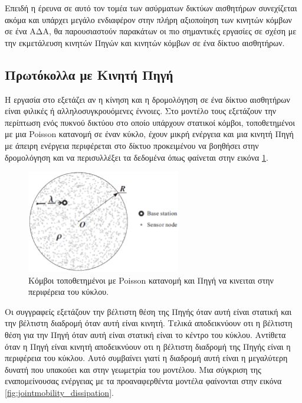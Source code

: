 Επειδή η έρευνα σε αυτό τον τομέα των ασύρματων δικτύων αισθητήρων συνεχίζεται ακόμα και υπάρχει μεγάλο ενδιαφέρον στην πλήρη αξιοποίηση των κινητών κόμβων σε ένα
ΑΔΑ, θα παρουσιαστούν παρακάτων οι πιο σημαντικές εργασίες σε σχέση με την εκμετάλευση κινητών Πηγών και κινητών κόμβων σε ένα δίκτυο αισθητήρων.

\subsection{Πρωτόκολλα με Κινητή Πηγή}
Η εργασία στο \cite{jointmobility} εξετάζει αν η κίνηση και η δρομολόγηση σε ένα δίκτυο αισθητήρων είναι φιλικές ή αλληλοσυγκρουόμενες έννοιες. Στο μοντέλο τους
εξετάζουν την περίπτωση ενός πυκνού δικτύου στο οποίο υπάρχουν στατικοί κόμβοι, τοποθετημένοι με μια Poisson κατανομή σε έναν κύκλο, έχουν μικρή ενέργεια και μια
κινητή Πηγή με άπειρη ενέργεια περιφέρεται στο δίκτυο προκειμένου να βοηθήσει στην δρομολόγηση και να περισυλλέξει τα δεδομένα όπως φαίνεται στην εικόνα
\ref{fig:jointmobility_model}.
\begin{figure}[h]
	\centering
	\includegraphics[width=0.6\textwidth]{images/jointmobility_model.eps}
	\caption{Κόμβοι τοποθετημένοι με Poisson κατανομή και Πηγή να κινειται στην περιφέρεια του κύκλου.}
	\label{fig:jointmobility_model}
\end{figure}
Οι συγγραφείς εξετάζουν την βέλτιστη θέση της Πηγής όταν αυτή είναι στατική και την βέλτιστη διαδρομή όταν αυτή είναι κινητή. Τελικά αποδεικνύουν οτι η βέλτιστη θέση
για την Πηγή όταν αυτή είναι στατική είναι το κέντρο του κύκλου. Αντίθετα όταν η Πηγή είναι κινητή αποδεικνύουν οτι η βέλτιστη διαδρομή της Πηγής είναι η περιφέρεια
του κύκλου. Αυτό συμβαίνει γιατί η διαδρομή αυτή είναι η μεγαλύτερη δυνατή που υπακούει και στην γεωμετρία του μοντέλου. Μια σύγκριση της εναπομείνουσας ενέργειας με
τα προαναφερθέντα μοντέλα φαίνονται στην εικόνα \ref{fig:jointmobility_dissipation}.
